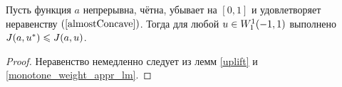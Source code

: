 \begin{cor}
Пусть функция $a$ непрерывна, чётна, убывает на $[0, 1]$ и удовлетворяет неравенству $(\ref{almostConcave})$.
Тогда для любой $u \in W_1^1(-1, 1)$ выполнено $J( a, u^* ) \leqslant J( a, u )$.
\end{cor}

\begin{proof}
Неравенство немедленно следует из лемм \ref{uplift} и \ref{monotone_weight_appr_lm}.
\end{proof}
